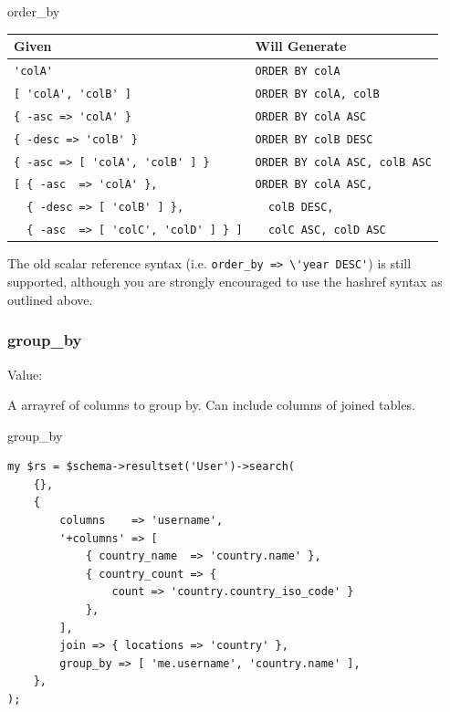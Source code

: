 \begin{frame}[fragile]{order\_by}
\begin{table}
\begin{tabular}{l | l}
Given & Will Generate \\
\hline
\footnotesize{\verb|'colA'|                         } & \footnotesize{\verb|ORDER BY colA|              } \\
\footnotesize{\verb|[ 'colA', 'colB' ]|             } & \footnotesize{\verb|ORDER BY colA, colB|        } \\
\footnotesize{\verb|{ -asc => 'colA' }|             } & \footnotesize{\verb|ORDER BY colA ASC|          } \\
\footnotesize{\verb|{ -desc => 'colB' }|            } & \footnotesize{\verb|ORDER BY colB DESC|         } \\
\footnotesize{\verb|{ -asc => [ 'colA', 'colB' ] }| } & \footnotesize{\verb|ORDER BY colA ASC, colB ASC|} \\
\footnotesize{\verb|[ { -asc  => 'colA' },|           } &   \footnotesize{\verb|ORDER BY colA ASC,|        } \\
\footnotesize{\verb|  { -desc => [ 'colB' ] },|       } &   \footnotesize{\verb|  colB DESC,|              } \\
\footnotesize{\verb|  { -asc  => [ 'colC', 'colD' ] } ]|} & \footnotesize{\verb|  colC ASC, colD ASC|      } \\
\end{tabular}
\end{table}
\end{frame}

The old scalar reference syntax (i.e. \verb|order_by => \'year DESC'|) is
still supported, although you are strongly encouraged to use the hashref
syntax as outlined above.

\subsubsection{group\_by}

Value: \@columns

A arrayref of columns to group by. Can include columns of joined tables.

\begin{frame}[fragile]{group\_by}
\begin{lstlisting}
my $rs = $schema->resultset('User')->search(
    {},
    {
        columns    => 'username',
        '+columns' => [ 
            { country_name  => 'country.name' },
            { country_count => {
                count => 'country.country_iso_code' }
            },
        ],
        join => { locations => 'country' },
        group_by => [ 'me.username', 'country.name' ],
    },
);
\end{lstlisting}
\end{frame}

